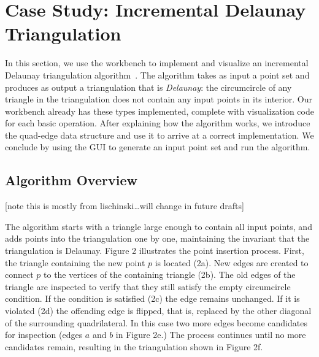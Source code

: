 
\FloatBarrier
\section{Case Study: Incremental Delaunay Triangulation}
\label{sec:case-delaunay}

In this section, we use the workbench to implement and visualize an incremental
Delaunay triangulation algorithm~\cite{lischinski1994incremental}. The algorithm
takes as input a point set and produces as output a triangulation that is
\emph{Delaunay}: the circumcircle of any triangle in the triangulation does not
contain any input points in its interior. Our workbench already has these types
implemented, complete with visualization code for each basic operation.
After explaining how the algorithm works, we introduce the quad-edge data
structure and use it to arrive at a correct implementation. We conclude by using
the GUI to generate an input point set and run the algorithm. 


\subsection{Algorithm Overview}

[note this is mostly from lischinski\ldots will change in future drafts]

The algorithm starts with a triangle large enough to contain all input points,
and adds points into the triangulation one by one, maintaining the invariant
that the triangulation is Delaunay. Figure 2 illustrates the point insertion
process. First, the triangle containing the new point $p$ is located (2a). New
edges are created to connect $p$ to the vertices of the containing triangle
(2b). The old edges of the triangle are inspected to verify that they still
satisfy the empty circumcircle condition. If the condition is satisfied (2c) the
edge remains unchanged. If it is violated (2d) the offending edge is flipped,
that is, replaced by the other diagonal of the surrounding quadrilateral. In
this case two more edges become candidates for inspection (edges $a$ and $b$ in
Figure 2e.) The process continues until no more candidates remain, resulting in
the triangulation shown in Figure 2f.

